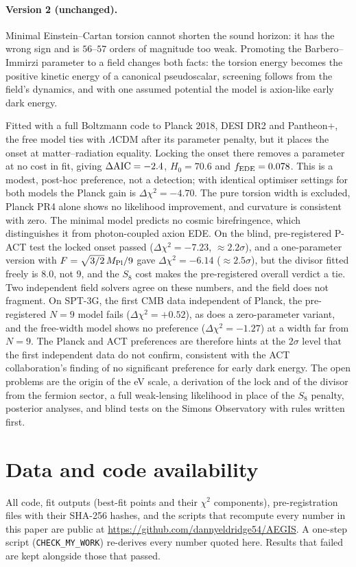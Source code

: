 \documentclass[11pt]{article}
\newcommand{\Mp}{M_{\rm Pl}}
\begin{document}
\paragraph{Version 2 (unchanged).}
Minimal Einstein--Cartan torsion cannot shorten the sound horizon: it has the wrong sign
and is $56$--$57$ orders of magnitude too weak. Promoting the Barbero--Immirzi parameter to a
field changes both facts: the torsion energy becomes the positive kinetic energy of a
canonical pseudoscalar, screening follows from the field's dynamics, and with one assumed
potential the model is axion-like early dark energy.

Fitted with a full Boltzmann code to Planck 2018, DESI DR2 and Pantheon+, the free model ties
with $\Lambda$CDM after its parameter penalty, but it places the onset at matter--radiation
equality. Locking the onset there removes a parameter at no cost in fit, giving
$\Delta{\rm AIC}=-2.4$, $H_0=70.6$ and $f_{\rm EDE}=0.078$. This is a modest, post-hoc
preference, not a detection; with identical optimiser settings for both models the Planck gain
is $\Delta\chi^2=-4.70$. The pure torsion width is excluded, Planck PR4 alone shows no
likelihood improvement, and curvature is consistent with zero. The minimal model predicts
no cosmic birefringence, which distinguishes it from photon-coupled axion EDE. On the blind,
pre-registered P-ACT test the locked onset passed ($\Delta\chi^2=-7.23$, $\approx2.2\sigma$), and a
one-parameter version with $F=\sqrt{3/2}\,\Mp/9$ gave $\Delta\chi^2=-6.14$ ($\approx2.5\sigma$), but
the divisor fitted freely is $8.0$, not $9$, and the $S_8$ cost makes the pre-registered overall
verdict a tie. Two independent field solvers agree on these numbers, and the field does not fragment.
On SPT-3G, the first CMB data independent of Planck, the pre-registered $N=9$ model fails
($\Delta\chi^2=+0.52$), as does a zero-parameter variant, and the free-width model shows no preference
($\Delta\chi^2=-1.27$) at a width far from $N=9$. The Planck and ACT preferences are therefore
hints at the $2\sigma$ level that the first independent data do not confirm, consistent with the ACT
collaboration's finding of no significant preference for early dark energy. The open problems are the
origin of the eV scale, a derivation of the lock and of the divisor from the fermion sector, a full
weak-lensing likelihood in place of the $S_8$ penalty, posterior analyses, and blind tests on the
Simons Observatory with rules written first.

\section*{Data and code availability}
All code, fit outputs (best-fit points and their $\chi^2$ components), pre-registration files
with their SHA-256 hashes, and the scripts that recompute every number in this paper are
public at \url{https://github.com/dannyeldridge54/AEGIS}. A one-step script (\texttt{CHECK\_MY\_WORK}) re-derives
every number quoted here. Results that failed are kept alongside those that passed.
\end{document}
